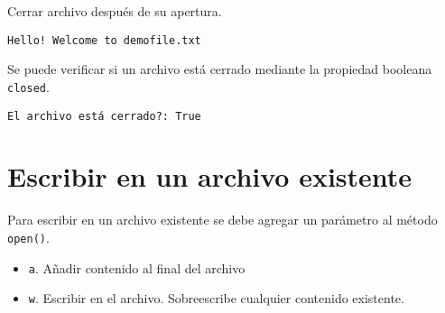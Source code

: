 \begin{code} Cerrar archivo después de su apertura.
\begin{Shaded}
\begin{Highlighting}[]
\OperatorTok{=} \NormalTok{(}\NormalTok{, }\NormalTok{)}
\end{Highlighting}
\end{Shaded}

\begin{verbatim}
Hello! Welcome to demofile.txt

\end{verbatim}

Se puede verificar si un archivo está cerrado mediante la propiedad
booleana \texttt{closed}.

\begin{Shaded}
\begin{Highlighting}[]
\NormalTok{(}\SpecialCharTok{\{}\SpecialCharTok{\}}\SpecialStringTok{\textquotesingle{}}\NormalTok{)}
\end{Highlighting}
\end{Shaded}

\begin{verbatim}
El archivo está cerrado?: True
\end{verbatim}
\end{code}

\section{Escribir en un archivo existente}

Para escribir en un archivo existente se debe agregar un parámetro al
método \texttt{open()}.

\begin{itemize}
  \item \texttt{\textquotesingle{}a\textquotesingle{}}. Añadir contenido al final del archivo
  \item \texttt{\textquotesingle{}w\textquotesingle{}}. Escribir en el archivo. Sobreescribe cualquier contenido existente.
\end{itemize}

